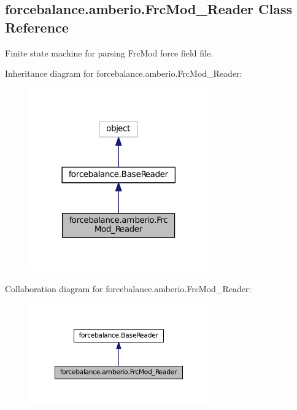 \hypertarget{classforcebalance_1_1amberio_1_1FrcMod__Reader}{\subsection{forcebalance.\-amberio.\-Frc\-Mod\-\_\-\-Reader Class Reference}
\label{classforcebalance_1_1amberio_1_1FrcMod__Reader}
}


Finite state machine for parsing Frc\-Mod force field file.  




Inheritance diagram for forcebalance.\-amberio.\-Frc\-Mod\-\_\-\-Reader\-:
\nopagebreak
\begin{figure}[H]
\begin{center}
\leavevmode
\includegraphics[width=218pt]{classforcebalance_1_1amberio_1_1FrcMod__Reader__inherit__graph}
\end{center}
\end{figure}


Collaboration diagram for forcebalance.\-amberio.\-Frc\-Mod\-\_\-\-Reader\-:
\nopagebreak
\begin{figure}[H]
\begin{center}
\leavevmode
\includegraphics[width=218pt]{classforcebalance_1_1amberio_1_1FrcMod__Reader__coll__graph}
\end{center}
\end{figure}
